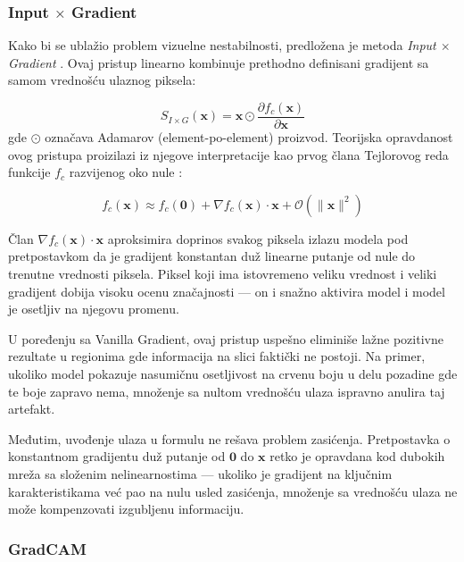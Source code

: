 \subsubsection{Input $\times$ Gradient}

Kako bi se ublažio problem vizuelne nestabilnosti, predložena je metoda \textit{Input $\times$ Gradient} \cite{kindermans2016investigating}. Ovaj pristup linearno kombinuje prethodno definisani gradijent sa samom vrednošću ulaznog piksela:

\begin{equation}
    S_{I \times G}(\mathbf{x}) = \mathbf{x} \odot \frac{\partial f_c(\mathbf{x})}{\partial \mathbf{x}}
\end{equation}
gde $\odot$ označava Adamarov (element-po-element) proizvod. Teorijska 
opravdanost ovog pristupa proizilazi iz njegove interpretacije kao prvog člana 
Tejlorovog reda funkcije $f_c$ razvijenog oko nule \cite{bach2015pixel}:

\begin{equation}
    f_c(\mathbf{x}) \approx f_c(\mathbf{0}) + \nabla f_c(\mathbf{x}) \cdot \mathbf{x} + \mathcal{O}(\|\mathbf{x}\|^2)
\end{equation}

Član $\nabla f_c(\mathbf{x}) \cdot \mathbf{x}$ aproksimira doprinos svakog piksela 
izlazu modela pod pretpostavkom da je gradijent konstantan duž linearne putanje od 
nule do trenutne vrednosti piksela. Piksel koji ima istovremeno veliku vrednost i 
veliki gradijent dobija visoku ocenu značajnosti — on i snažno aktivira model i 
model je osetljiv na njegovu promenu.

U poređenju sa Vanilla Gradient, ovaj pristup uspešno eliminiše lažne 
pozitivne rezultate u regionima gde informacija na slici faktički ne postoji. 
Na primer, ukoliko model pokazuje nasumičnu osetljivost na crvenu boju u delu pozadine gde te boje zapravo nema, množenje sa nultom vrednošću ulaza ispravno anulira taj artefakt.

Međutim, uvođenje ulaza u formulu ne rešava problem zasićenja. Pretpostavka o 
konstantnom gradijentu duž putanje od $\mathbf{0}$ do $\mathbf{x}$ retko je 
opravdana kod dubokih mreža sa složenim nelinearnostima — ukoliko je gradijent 
na ključnim karakteristikama već pao na nulu usled zasićenja, množenje sa vrednošću 
ulaza ne može kompenzovati izgubljenu informaciju.

\subsubsection{GradCAM}

